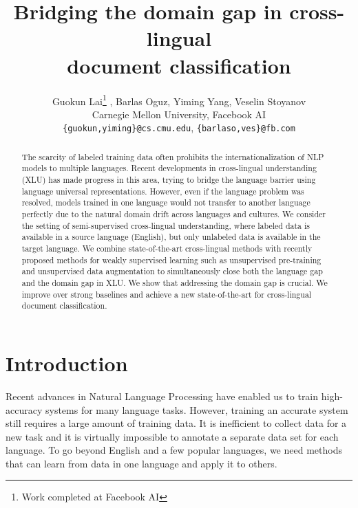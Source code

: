 \documentclass{article} \usepackage{iclr2020_conference,times}
\title{Bridging the domain gap in cross-lingual \\ document classification}
\author{Guokun Lai\thanks{Work completed at Facebook AI} , Barlas Oguz, Yiming Yang, Veselin Stoyanov   \\
	Carnegie Mellon University, Facebook AI  \\
	\texttt{\{guokun,yiming\}@cs.cmu.edu}, \texttt{\{barlaso,ves\}@fb.com} \\
}
\begin{document}
\maketitle

\begin{abstract}
The scarcity of labeled training data often prohibits the internationalization of NLP models to multiple languages.  Recent developments in cross-lingual understanding (XLU) has made progress in this area, trying to bridge the language barrier using language universal representations.  However, even if the language problem was resolved,  models trained in one language would not transfer to another language perfectly due to the natural domain drift across languages and cultures.  We consider the setting of semi-supervised cross-lingual understanding, where labeled data is available in a source language (English), but only unlabeled data is available in the target language.  We combine state-of-the-art cross-lingual methods with recently proposed methods for weakly supervised learning such as unsupervised pre-training and unsupervised data augmentation to simultaneously close both the language gap and the domain gap in XLU.  We show that addressing the domain gap is crucial.  We improve over strong baselines and achieve a new state-of-the-art for cross-lingual document classification.
\end{abstract} 
\section{Introduction}
\label{sec:intro}



Recent advances in Natural Language Processing have enabled us to train high-accuracy systems for many language tasks. 
However, training an accurate system still requires a large amount of training data. 
It is inefficient to collect data for a new task and it is virtually impossible to annotate a separate data set for each language. 
To go beyond English and a few popular languages, we need methods that can learn from data in one language and apply it to others.  
\end{document}
